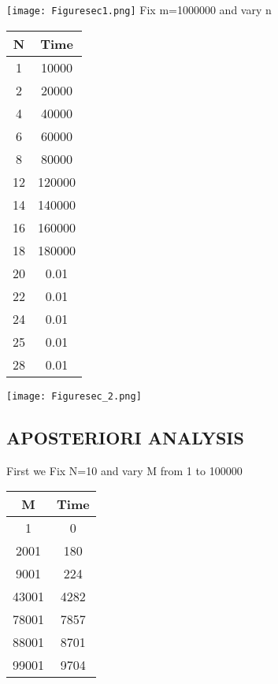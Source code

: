\documentclass[conference]{IEEEtran}
\begin{document}
\texttt{[image: Figuresec1.png]}
\newline
Fix m=1000000 and vary n
\begin{center}
   \begin{tabular}{|c|c|}
   \hline
   N & Time \\
   \hline\hline
    1 & 10000 \\
    \hline
    2 & 20000 \\
    \hline
    4 & 40000 \\
    \hline
    6 & 60000 \\
    \hline
    8 & 80000 \\
    \hline
    12& 120000 \\
    \hline
    14 & 140000 \\
    \hline
    16 & 160000 \\
    \hline
    18 & 180000 \\
    \hline
    20 & 0.01 \\
    \hline
    22 & 0.01 \\
    \hline
    24 & 0.01 \\
    \hline
    25 & 0.01 \\
    \hline
    28 & 0.01 \\
    \hline
    \end{tabular} 
\end{center}
\texttt{[image: Figuresec\_2.png]}
\newline


\subsection{APOSTERIORI ANALYSIS }

First we Fix N=10 and vary M from 1 to 100000

\begin{center}
   \begin{tabular}{|c|c|}
   \hline
   M & Time \\
   \hline\hline
    1 & 0 \\
    \hline
    2001 & 180 \\
    \hline
    9001 & 224 \\
    \hline
    43001 & 4282 \\
    \hline
    78001 & 7857 \\
    \hline
    88001 & 8701 \\
    \hline
    99001 & 9704 \\
    \hline
    \end{tabular} 
\end{center}
\end{document}
